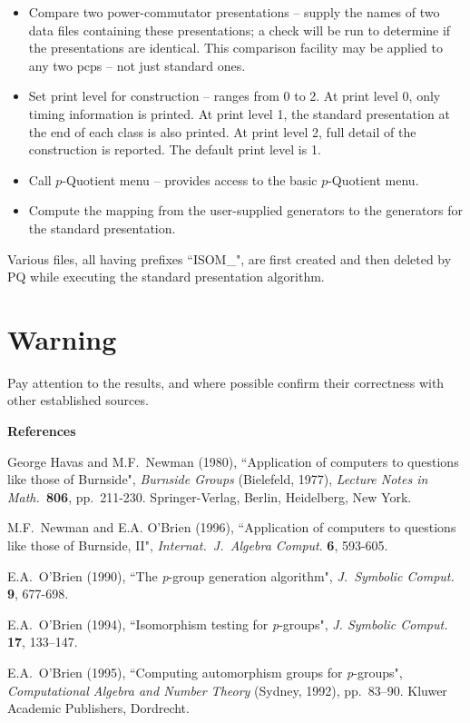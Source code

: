 \begin{itemize}
\item Compare two power-commutator presentations -- 
supply the names of two data files containing these
presentations; a check will be run to determine if the
presentations are identical. 
This comparison facility may be applied to any two
pcps -- not just standard ones.

\item  Set print level for construction -- ranges from 0 to 2.
At print level 0, only timing information is printed.
At print level 1, the standard presentation at the end
of each class is also printed.
At print level 2, full detail of the construction is
reported. The default print level is 1.

\item Call $p$-Quotient menu -- provides access to the 
basic $p$-Quotient menu.

\item Compute the mapping from the user-supplied generators
to the generators for the standard presentation.
\end{itemize}

Various files, all having prefixes ``ISOM\_", are first created and 
then deleted by PQ while executing the standard presentation algorithm. 
\section{Warning}
Pay attention to the results, and where possible confirm 
their correctness with other established sources.


\begin{description}
\item\begin{center}{\bf References}\end{center}

\item George Havas and M.F.\ Newman (1980), ``Application of computers to
questions like those of Burnside", {\it Burnside Groups} (Bielefeld, 1977),
{\it Lecture Notes in Math.\ }{\bf 806}, pp.\ 211-230.
Springer-Verlag, Berlin, Heidelberg, New York.

\item M.F.\ Newman and E.A. O'Brien (1996),
``Application of computers to questions like those of Burnside, {II}",
{\it Internat.\ J.\ Algebra Comput}. {\bf 6}, 593-605.
 
\item E.A.\ O'Brien (1990), ``The {\it p}-group generation
algorithm", {\it J.\ Symbolic Comput.} {\bf 9}, 677-698.

\item E.A.\ O'Brien (1994), ``Isomorphism testing
for \mbox{{\it p}-groups}", {\it J. Symbolic Comput.} {\bf 17},
133--147.

\item E.A.\ O'Brien (1995), ``Computing automorphism groups for
{\it p}-groups",  {\it Computational Algebra and Number Theory}
(Sydney, 1992), pp.\ 83--90. Kluwer Academic Publishers, Dordrecht.

\end{description}

